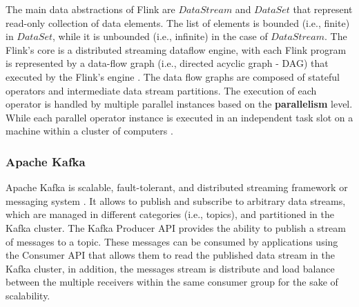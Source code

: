 \par The main data abstractions of Flink are $DataStream$ and $DataSet$ that represent read-only collection of data elements. The list of elements is bounded (i.e., finite) in $DataSet$, while it is unbounded (i.e., infinite) in the case of $DataStream$. The Flink's core is a distributed streaming dataflow engine, with each
Flink program is represented by a data-flow graph (i.e., directed acyclic graph - DAG) that executed by the Flink's engine \cite{carbone2015apache}. The data flow graphs are composed of stateful operators and intermediate data stream partitions.  The execution of each operator is handled by multiple parallel instances based on the \textbf{parallelism} level. While each parallel operator instance is executed in an independent task slot on a machine within a cluster of computers \cite{Flink}.    

\subsubsection*{Apache Kafka}

\par Apache Kafka is scalable, fault-tolerant, and distributed streaming framework or messaging system \cite{Kafka}. It allows to publish and subscribe to arbitrary data streams, which are managed in different categories (i.e., topics), and  partitioned in the Kafka cluster. The Kafka Producer API provides the ability to publish a stream of messages to a topic. These messages can be consumed by applications using the Consumer API that allows them to read the published data stream in the Kafka cluster, in addition, the messages stream is distribute and load balance between the multiple receivers within the same consumer group for the sake of scalability.
  





%
